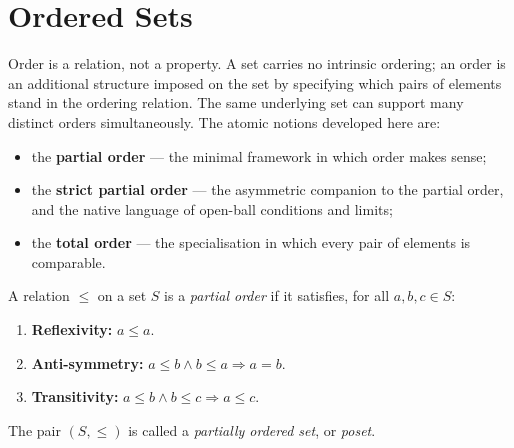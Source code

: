 
\section{Ordered Sets}
\label{sec:ordered-sets}

\begin{tcolorbox}[
  colback=gray!6,
  colframe=gray!40,
  arc=2pt,
  left=8pt, right=8pt, top=6pt, bottom=6pt,
  title={\small\textbf{Toolkit: Ordered Sets}},
  fonttitle=\small\bfseries
]
Order is a relation, not a property.  A set carries no intrinsic ordering;
an order is an additional structure imposed on the set by specifying which
pairs of elements stand in the ordering relation.  The same underlying set
can support many distinct orders simultaneously.  The atomic notions
developed here are:
\begin{itemize}
  \item the \textbf{partial order} — the minimal framework in which order
        makes sense;
  \item the \textbf{strict partial order} — the asymmetric companion to the
        partial order, and the native language of open-ball conditions and
        limits;
  \item the \textbf{total order} — the specialisation in which every pair of
        elements is comparable.
\end{itemize}
\end{tcolorbox}


\begin{tcolorbox}[colback=defbox, colframe=defborder, arc=2pt,
  left=6pt, right=6pt, top=4pt, bottom=4pt,
  title={\small\textbf{Definition (Partial Order)}},
  fonttitle=\small\bfseries]
\begin{definition}
\label{def:lattice-order-partial-order}
A relation $\leq$ on a set $S$ is a \emph{partial order} if it satisfies,
for all $a, b, c \in S$:
\begin{enumerate}
  \item \textbf{Reflexivity:} $a \leq a$.
  \item \textbf{Anti-symmetry:} $a \leq b \land b \leq a \Longrightarrow a = b$.
  \item \textbf{Transitivity:} $a \leq b \land b \leq c \Longrightarrow a \leq c$.
\end{enumerate}
The pair $(S, \leq)$ is called a \emph{partially ordered set}, or \emph{poset}.
\end{definition}
\end{tcolorbox}

